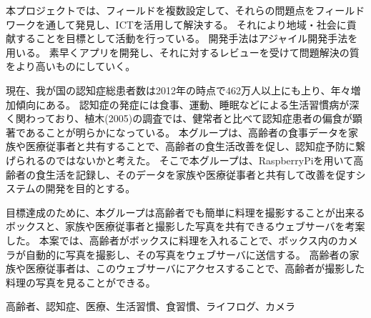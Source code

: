 \documentclass[../report]{subfiles}
\begin{document}
\begin{jabstract}
本プロジェクトでは、フィールドを複数設定して、それらの問題点をフィールドワークを通して発見し、ICTを活用して解決する。
それにより地域・社会に貢献することを目標として活動を行っている。
開発手法はアジャイル開発手法を用いる。
素早くアプリを開発し、それに対するレビューを受けて問題解決の質をより高いものにしていく。

現在、我が国の認知症総患者数は2012年の時点で462万人以上にも上り、年々増加傾向にある。
認知症の発症には食事、運動、睡眠などによる生活習慣病が深く関わっており、植木(2005)の調査では、健常者と比べて認知症患者の偏食が顕著であることが明らかになっている。
本グループは、高齢者の食事データを家族や医療従事者と共有することで、高齢者の食生活改善を促し、認知症予防に繋げられるのではないかと考えた。
そこで本グループは、RaspberryPiを用いて高齢者の食生活を記録し、そのデータを家族や医療従事者と共有して改善を促すシステムの開発を目的とする。

目標達成のために、本グループは高齢者でも簡単に料理を撮影することが出来るボックスと、家族や医療従事者と撮影した写真を共有できるウェブサーバを考案した。
本案では、高齢者がボックスに料理を入れることで、ボックス内のカメラが自動的に写真を撮影し、その写真をウェブサーバに送信する。
高齢者の家族や医療従事者は、このウェブサーバにアクセスすることで、高齢者が撮影した料理の写真を見ることができる。
\begin{jkeyword}
高齢者、認知症、医療、生活習慣、食習慣、ライフログ、カメラ
\end{jkeyword}
\end{jabstract}
\end{document}
